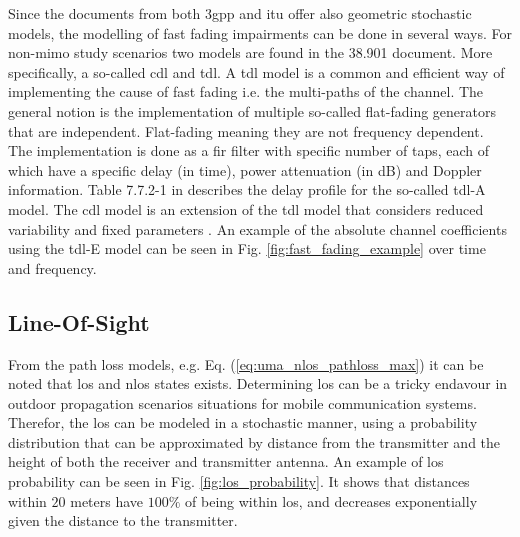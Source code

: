 Since the documents from both \gls{3gpp} and \gls{itu} offer also geometric stochastic models, the modelling of fast fading impairments can be done in several ways. For non-\gls{mimo} study scenarios two models are found in the 38.901 document. More specifically, a so-called \gls{cdl} and \gls{tdl}. A \gls{tdl} model is a common and efficient way of implementing the cause of fast fading i.e. the multi-paths of the channel. The general notion is the implementation of multiple so-called flat-fading generators that are independent. Flat-fading meaning they are not frequency dependent. The implementation is done as a \gls{fir} filter with specific number of taps, each of which have a specific delay (in time),  power attenuation (in dB) and Doppler information. Table 7.7.2-1 in \cite{3GPP38901} describes the delay profile for the so-called \gls{tdl}-A model. The \gls{cdl} model is an extension of the \gls{tdl} model that considers reduced variability and fixed parameters \cite{ITU2412}. An example of the absolute channel coefficients using the \gls{tdl}-E model can be seen in Fig. \ref{fig:fast_fading_example} over time and frequency. 



\subsection{Line-Of-Sight}\label{subsec:los}
From the path loss models, e.g. Eq. (\ref{eq:uma_nlos_pathloss_max}) it can be noted that \gls{los} and \gls{nlos} states exists. Determining \gls{los} can be a tricky endavour in outdoor propagation scenarios situations for mobile communication systems. Therefor, the \gls{los} can be modeled in a stochastic manner, using a probability distribution that can be approximated by distance from the transmitter and the height of both the receiver and transmitter antenna. An example of \gls{los} probability can be seen in Fig. \ref{fig:los_probability}. It shows that distances within $20$ meters have $100\%$ of being within \gls{los}, and decreases exponentially given the distance to the transmitter. 

